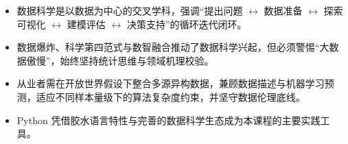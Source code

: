 \begin{summary}[本章要点]
\begin{itemize}
  \item 数据科学是以数据为中心的交叉学科，强调“提出问题 $\leftrightarrow$ 数据准备 $\leftrightarrow$ 探索可视化 $\leftrightarrow$ 建模评估 $\leftrightarrow$ 决策支持”的循环迭代闭环。
  \item 数据爆炸、科学第四范式与数智融合推动了数据科学兴起，但必须警惕“大数据傲慢”，始终坚持统计思维与领域机理校验。
  \item 从业者需在开放世界假设下整合多源异构数据，兼顾数据描述与机器学习预测，适应不同样本量级下的算法复杂度约束，并坚守数据伦理底线。
  \item Python 凭借胶水语言特性与完善的数据科学生态成为本课程的主要实践工具。
\end{itemize}
\end{summary}
